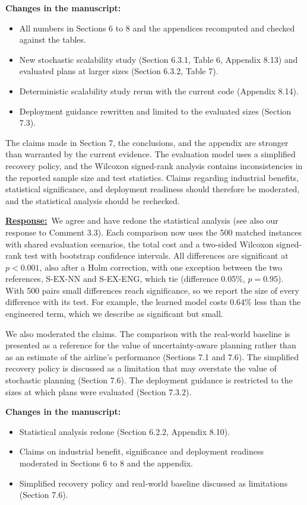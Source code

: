 \documentclass{article}
\newcommand{\response}{\vspace{0.1cm}\noindent\underline{\textbf{Response:}}\ }
\newcommand{\changes}{\vspace{0.1cm}\noindent\textbf{Changes in the manuscript:}}
\begin{document}
\changes
\begin{itemize}[nosep]
\item All numbers in Sections 6 to 8 and the appendices recomputed and checked against the tables.
\item New stochastic scalability study (Section 6.3.1, Table 6, Appendix 8.13) and evaluated plans at larger sizes (Section 6.3.2, Table 7).
\item Deterministic scalability study rerun with the current code (Appendix 8.14).
\item Deployment guidance rewritten and limited to the evaluated sizes (Section 7.3).
\end{itemize}

\begin{cmt}{}{}
The claims made in Section 7, the conclusions, and the appendix are stronger than warranted by the current evidence. The evaluation model uses a simplified recovery policy, and the Wilcoxon signed-rank analysis contains inconsistencies in the reported sample size and test statistics. Claims regarding industrial benefits, statistical significance, and deployment readiness should therefore be moderated, and the statistical analysis should be rechecked.
\end{cmt}

\response We agree and have redone the statistical analysis (see also our response to Comment 3.3). Each comparison now uses the 500 matched instances with shared evaluation scenarios, the total cost and a two-sided Wilcoxon signed-rank test with bootstrap confidence intervals. All differences are significant at $p < 0.001$, also after a Holm correction, with one exception between the two references, S-EX-NN and S-EX-ENG, which tie (difference 0.05\%, $p = 0.95$). With 500 pairs small differences reach significance, so we report the size of every difference with its test. For example, the learned model costs 0.64\% less than the engineered term, which we describe as significant but small.

We also moderated the claims. The comparison with the real-world baseline is presented as a reference for the value of uncertainty-aware planning rather than as an estimate of the airline's performance (Sections 7.1 and 7.6). The simplified recovery policy is discussed as a limitation that may overstate the value of stochastic planning (Section 7.6). The deployment guidance is restricted to the sizes at which plans were evaluated (Section 7.3.2).

\changes
\begin{itemize}[nosep]
\item Statistical analysis redone (Section 6.2.2, Appendix 8.10).
\item Claims on industrial benefit, significance and deployment readiness moderated in Sections 6 to 8 and the appendix.
\item Simplified recovery policy and real-world baseline discussed as limitations (Section 7.6).
\end{itemize}
\end{document}
